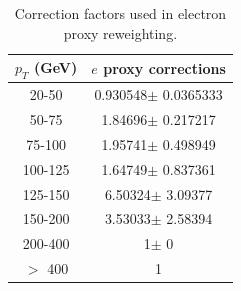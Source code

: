 \begin{table}[htdp]
	\centering
  \begin{tabular}{|c|c|}
  \hline
  $p_T$ (GeV)  & $e$ proxy corrections \\ \hline
  20-50  & 0.930548$\pm$ 0.0365333  \\ \hline
  50-75  & 1.84696$\pm$ 0.217217  \\ \hline
  75-100  & 1.95741$\pm$ 0.498949  \\ \hline
  100-125  & 1.64749$\pm$ 0.837361  \\ \hline
  125-150  & 6.50324$\pm$ 3.09377  \\ \hline
  150-200  & 3.53033$\pm$ 2.58394  \\ \hline
  200-400  & 1$\pm$ 0  \\ \hline
  $>$ 400 & 1 \\ \hline
  \end{tabular}
  \caption{Correction factors used in electron proxy reweighting.}
  \label{table:correctionsfakelep}
\end{table}
